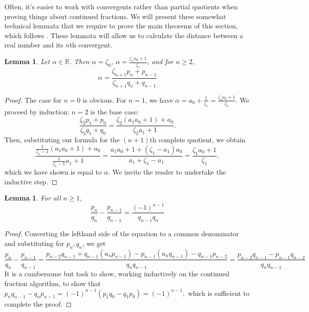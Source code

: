 \documentclass[12pt, letterpaper, oneside]{book}
\newcommand{\ga}{\ensuremath{\alpha}}
\newcommand{\gz}{\ensuremath{\zeta}}
\newcommand{\R}{\mathbb{R}}
\theoremstyle{plain}
\newtheorem{lemma}[theorem]{Lemma}
\theoremstyle{definition}
\theoremstyle{remark}
\begin{document}
Often, it's easier to work with convergents rather than partial quotients when proving things about continued fractions. We will present three somewhat technical lemmata that we require to prove the main theorems of this section, which follows \cite{GH60}. These lemmata will allow us to calculate the distance between a real number and its $n$th convergent. 
\begin{lemma}\label{lem:compquotients}
  Let $\ga \in \R$. Then $\ga = \gz_0$,
  $\ga = \frac{\gz_1a_0+1}{\gz_1}$, and for $n\geq2$,
  \[
    \ga = \frac{\gz_{n+1}p_n+p_{n-1}}{\gz_{n+1}q_n+q_{n-1}}
  \]
\end{lemma}
 
\begin{proof}
  The case for $n=0$ is obvious. For $n=1$, we have
  $\ga = a_0 + \frac{1}{\gz_1} = \frac{\gz_1a_0+1}{\gz_1}$. We proceed
  by induction: $n=2$ is the base case:
  \[
    \frac{\gz_2p_1+p_0}{\gz_2q_1+q_0}=\frac{\gz_2(a_1a_0+1)+a_0}{\gz_2a_1+1}.
  \]
  Then, substituting our formula for the $(n +1)$th complete quotient,
  we obtain
  \[
    \frac{\frac{1}{\gz_1-1}(a_1a_0+1)+a_0}{{\frac{1}{\gz_1-1}a_1+1}} = 
    \frac{a_1a_0+1+(\gz_1-a_1)a_0}{a_1+\gz_1-a_1}=\frac{\gz_1a_0+1}{\gz_1},
  \]
  which we have shown is equal to $\ga$. We invite the reader to undertake the inductive step. 
\end{proof}

\begin{lemma}\label{lem:3}
  For all $n\geq1$,
  \[
    \frac{p_n}{q_n}-\frac{p_{n-1}}{q_{n-1}} =
    \frac{(-1)^{n-1}}{q_{n-1}q_n}
  \]
\end{lemma}
\begin{proof}
  Converting the lefthand side of the equation to a common denominator and substituting for $p_n,q_n$, we get
  \[
    \frac{p_n}{q_n}-\frac{p_{n-1}}{q_{n-1}} =
    \frac{p_{n-2}q_{n-1} +q_{n-1}(a_np_{n-1}) - p_{n-1}(a_nq_{n-1}) - q_{n-1}p_{n-2}}{q_nq_{n-1}}
    = \frac{p_{n-2}q_{n-1}-p_{n-1}q_{n-2}}{q_nq_{n-1}}
  \]
  It is a cumbersome but task to show, working inductively on the continued fraction algorithm, to show that $p_nq_{n-1}-q_np_{n-1} = (-1)^{n-1}(p_1q_0-q_1p_0)=(-1)^{n-1},$ which is sufficient to complete the proof.
\end{proof}
\end{document}
